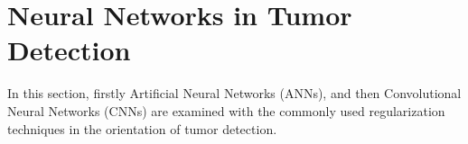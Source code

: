 \chapter{Neural Networks in Tumor Detection}
\thispagestyle{empty}

    In this section, firstly Artificial Neural Networks (ANNs), and then Convolutional Neural Networks (CNNs) are examined
    with the commonly used regularization techniques in the orientation of tumor detection.

    

    

    

